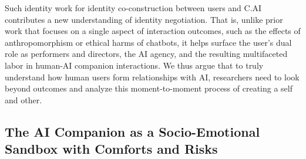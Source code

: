 \documentclass[sigconf, nonacm]{acmart}
\begin{document}

Such identity work for identity co-construction between users and C.AI contributes a new understanding of identity negotiation. That is, unlike prior work that focuses on a single aspect of interaction outcomes, such as the effects of anthropomorphism \cite{muresan2019chats} or ethical harms \cite{meng2023mediated} of chatbots, it helps surface the user's dual role as performers and directors, the AI agency, and the resulting multifaceted labor in human-AI companion interactions. We thus argue that to truly understand how human users form relationships with AI, researchers need to look beyond outcomes and analyze this moment-to-moment process of creating a self and other.


\subsection{The AI Companion as a Socio-Emotional Sandbox with Comforts and Risks}
\end{document}
